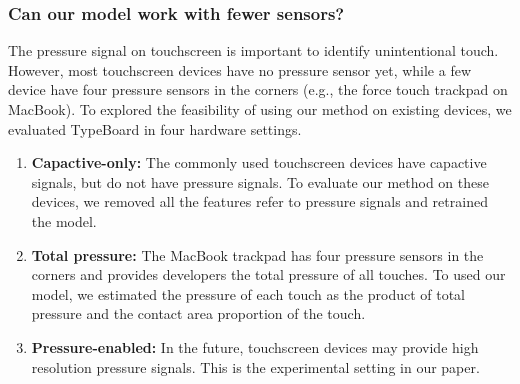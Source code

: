 

\subsubsection{Can our model work with fewer sensors?}

The pressure signal on touchscreen is important to identify unintentional touch. However, most touchscreen devices have no pressure sensor yet, while a few device have four pressure sensors in the corners (e.g., the force touch trackpad on MacBook). To explored the feasibility of using our method on existing devices, we evaluated TypeBoard in four hardware settings. 

\begin{enumerate}
	\item{\textbf{Capactive-only:} The commonly used touchscreen devices have capactive signals, but do not have pressure signals. To evaluate our method on these devices, we removed all the features refer to pressure signals and retrained the model.}
	\item{\textbf{Total pressure:} The MacBook trackpad has four pressure sensors in the corners and provides developers the total pressure of all touches. To used our model, we estimated the pressure of each touch as the product of total pressure and the contact area proportion of the touch.}
	\item{\textbf{Pressure-enabled:} In the future, touchscreen devices may provide high resolution pressure signals. This is the experimental setting in our paper.}
\end{enumerate}

